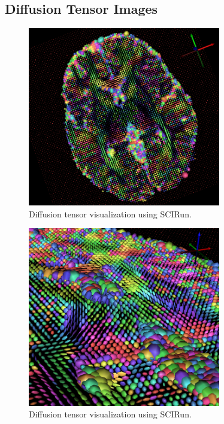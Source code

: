 \subsection{Diffusion Tensor Images}
\begin{figure}[H]
\begin{center}
\includegraphics[width=0.75\textwidth]{Figures/DTI_1.png}
\caption{Diffusion tensor visualization using SCIRun.}
\label{fig:tensorvis}
\end{center}
\end{figure}

\begin{figure}[H]
\begin{center}
\includegraphics[width=0.75\textwidth]{Figures/DTI_2.png}
\caption{Diffusion tensor visualization using SCIRun.}
\label{fig:tensorvis2}
\end{center}
\end{figure}

